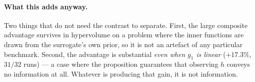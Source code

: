 \paragraph{What this adds anyway.} Two things that do not need the contrast to
separate. First, the large composite advantage survives in hypervolume on a
problem where the inner functions are drawn from the surrogate's own prior, so
it is not an artefact of any particular benchmark. Second, the advantage is
substantial \emph{even when $g_1$ is linear} ($+17.3\%$, $31/32$ runs) --- a
case where the proposition guarantees that observing $h$ conveys no information
at all. Whatever is producing that gain, it is not information.
